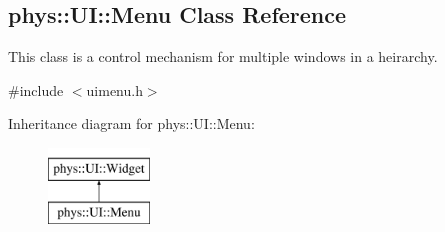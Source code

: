 \hypertarget{classphys_1_1UI_1_1Menu}{
\subsection{phys::UI::Menu Class Reference}
\label{classphys_1_1UI_1_1Menu}
}


This class is a control mechanism for multiple windows in a heirarchy.  




{\ttfamily \#include $<$uimenu.h$>$}

Inheritance diagram for phys::UI::Menu:\begin{figure}[H]
\begin{center}
\leavevmode
\includegraphics[height=2.000000cm]{classphys_1_1UI_1_1Menu}
\end{center}
\end{figure}
